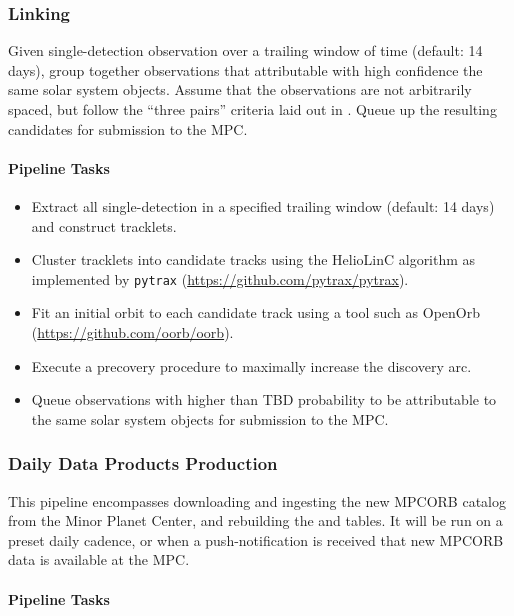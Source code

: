 \subsubsection{Linking}

Given single-detection observation over a trailing window of time (default: 14 days), group together observations that attributable with high confidence the same solar system objects. Assume that the observations are not arbitrarily spaced, but follow the ``three pairs'' criteria laid out in \OSS\@ {}. Queue up the resulting candidates for submission to the MPC.

\paragraph{Pipeline Tasks}

\begin{itemize}
\item Extract all single-detection \DIAObjects in a specified trailing window (default: 14 days) and construct tracklets.
\item Cluster tracklets into candidate tracks using the HelioLinC algorithm as implemented by {\tt pytrax} (\url{https://github.com/pytrax/pytrax}).
\item Fit an initial orbit to each candidate track using a tool such as OpenOrb (\url{https://github.com/oorb/oorb}).
\item Execute a precovery procedure to maximally increase the discovery arc.
\item Queue observations with higher than TBD probability to be attributable to the same solar system objects for submission to the MPC.
\end{itemize}



\subsubsection{Daily Data Products Production}

This pipeline encompasses downloading and ingesting the new MPCORB catalog from the Minor Planet Center, and rebuilding the \SSObject and \SSSource tables. It will be run on a preset daily cadence, or when a push-notification is received that new MPCORB data is available at the MPC.

\paragraph{Pipeline Tasks}

